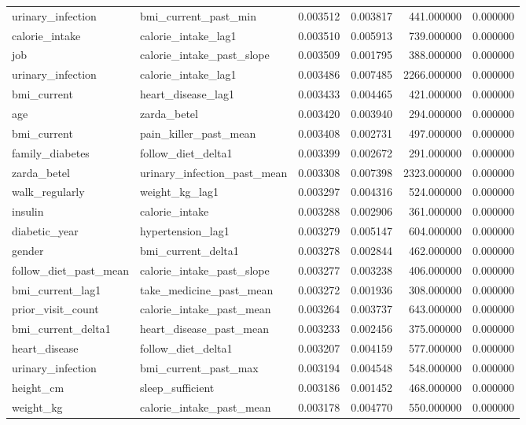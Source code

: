 \begin{longtable}{llrrrr}
urinary\_infection & bmi\_current\_past\_min & 0.003512 & 0.003817 & 441.000000 & 0.000000 \\
calorie\_intake & calorie\_intake\_lag1 & 0.003510 & 0.005913 & 739.000000 & 0.000000 \\
job & calorie\_intake\_past\_slope & 0.003509 & 0.001795 & 388.000000 & 0.000000 \\
urinary\_infection & calorie\_intake\_lag1 & 0.003486 & 0.007485 & 2266.000000 & 0.000000 \\
bmi\_current & heart\_disease\_lag1 & 0.003433 & 0.004465 & 421.000000 & 0.000000 \\
age & zarda\_betel & 0.003420 & 0.003940 & 294.000000 & 0.000000 \\
bmi\_current & pain\_killer\_past\_mean & 0.003408 & 0.002731 & 497.000000 & 0.000000 \\
family\_diabetes & follow\_diet\_delta1 & 0.003399 & 0.002672 & 291.000000 & 0.000000 \\
zarda\_betel & urinary\_infection\_past\_mean & 0.003308 & 0.007398 & 2323.000000 & 0.000000 \\
walk\_regularly & weight\_kg\_lag1 & 0.003297 & 0.004316 & 524.000000 & 0.000000 \\
insulin & calorie\_intake & 0.003288 & 0.002906 & 361.000000 & 0.000000 \\
diabetic\_year & hypertension\_lag1 & 0.003279 & 0.005147 & 604.000000 & 0.000000 \\
gender & bmi\_current\_delta1 & 0.003278 & 0.002844 & 462.000000 & 0.000000 \\
follow\_diet\_past\_mean & calorie\_intake\_past\_slope & 0.003277 & 0.003238 & 406.000000 & 0.000000 \\
bmi\_current\_lag1 & take\_medicine\_past\_mean & 0.003272 & 0.001936 & 308.000000 & 0.000000 \\
prior\_visit\_count & calorie\_intake\_past\_mean & 0.003264 & 0.003737 & 643.000000 & 0.000000 \\
bmi\_current\_delta1 & heart\_disease\_past\_mean & 0.003233 & 0.002456 & 375.000000 & 0.000000 \\
heart\_disease & follow\_diet\_delta1 & 0.003207 & 0.004159 & 577.000000 & 0.000000 \\
urinary\_infection & bmi\_current\_past\_max & 0.003194 & 0.004548 & 548.000000 & 0.000000 \\
height\_cm & sleep\_sufficient & 0.003186 & 0.001452 & 468.000000 & 0.000000 \\
weight\_kg & calorie\_intake\_past\_mean & 0.003178 & 0.004770 & 550.000000 & 0.000000 \\

\end{longtable}
